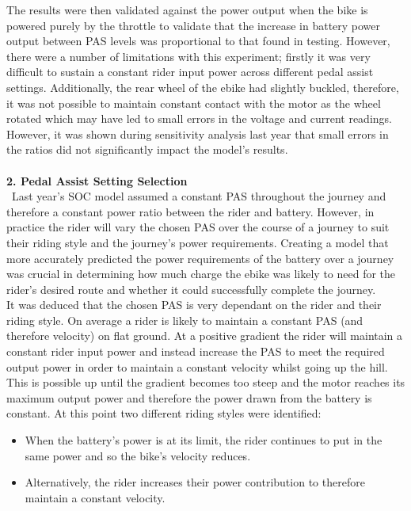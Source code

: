\documentclass[a4paper, 10pt]{article}
\numberwithin{equation}{section}
\begin{document}
The results were then validated against the power output when the bike is powered purely by the throttle to validate that the increase in battery power output between PAS levels was proportional to that found in testing. However, there were a number of limitations with this experiment; firstly it was very difficult to sustain a constant rider input power across different pedal assist settings. Additionally, the rear wheel of the ebike had slightly buckled, therefore, it was not possible to maintain constant contact with the motor as the wheel rotated which may have led to small errors in the voltage and current readings. However, it was shown during sensitivity analysis last year that small errors in the ratios did not significantly impact the model's results.
\\
\\
\textbf{2. Pedal Assist Setting Selection}
\\
\
Last year's SOC model assumed a constant PAS throughout the journey and therefore a constant power ratio between the rider and battery. However, in practice the rider will vary the chosen PAS over the course of a journey to suit their riding style and the journey's power requirements. Creating a model that more accurately predicted the power requirements of the battery over a journey was crucial in determining how much charge the ebike was likely to need for the rider's desired route and whether it could successfully complete the journey.
\\
It was deduced that the chosen PAS is very dependant on the rider and their riding style. On average a rider is likely to maintain a constant PAS (and therefore velocity) on flat ground. At a positive gradient the rider will maintain a constant rider input power and instead increase the PAS to meet the required output power in order to maintain a constant velocity whilst going up the hill. This is possible up until the gradient becomes too steep and the motor reaches its maximum output power and therefore the power drawn from the battery is constant. At this point two different riding styles were identified:

\begin{itemize}
    \item When the battery's power is at its limit, the rider continues to put in the same power and so the bike's velocity reduces.
    \item Alternatively, the rider increases their power contribution to therefore maintain a constant velocity.
\end{itemize}
\end{document}
